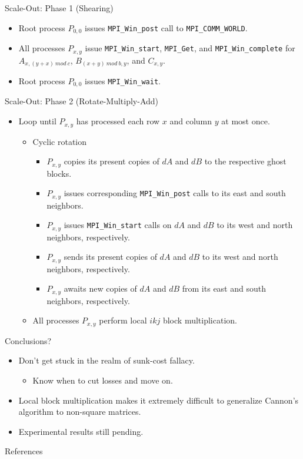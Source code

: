 \documentclass{beamer}
\begin{document}
\begin{frame}{Scale-Out: Phase 1 (Shearing)}
  \begin{itemize}
  \item{Root process $P_{0,0}$ issues \texttt{MPI\_Win\_post} call to \texttt{MPI\_COMM\_WORLD}.}
  \item{All processes $P_{x,y}$ issue \texttt{MPI\_Win\_start}, \texttt{MPI\_Get}, and \texttt{MPI\_Win\_complete} for $A_{x,(y+x)\ mod\ c}$, $B_{(x+y)\ mod\ b, y}$, and $C_{x,y}$.}
  \item{Root process $P_{0,0}$ issues \texttt{MPI\_Win\_wait}.}
  \end{itemize}
\end{frame}
\begin{frame}{Scale-Out: Phase 2 (Rotate-Multiply-Add)}
  \begin{itemize}
    \item{Loop until $P_{x,y}$ has processed each row $x$ and column $y$ at most once.}
      \begin{itemize}
      \item{Cyclic rotation}
        \begin{itemize}
        \item{$P_{x,y}$ copies its present copies of $dA$ and $dB$ to the respective ghost blocks.}
        \item{$P_{x,y}$ issues corresponding \texttt{MPI\_Win\_post} calls to its east and south neighbors.}
        \item{$P_{x,y}$ issues \texttt{MPI\_Win\_start} calls on $dA$ and $dB$ to its west and north neighbors, respectively.}
        \item{$P_{x,y}$ sends its present copies of $dA$ and $dB$ to its west and north neighbors, respectively.}
        \item{$P_{x,y}$ awaits new copies of $dA$ and $dB$ from its east and south neighbors, respectively.}
        \end{itemize}
      \item{All processes $P_{x,y}$ perform local $ikj$ block multiplication.}
      \end{itemize}
  \end{itemize}
\end{frame}
\begin{frame}{Conclusions?}
  \begin{itemize}
  \item{Don't get stuck in the realm of sunk-cost fallacy.}
    \begin{itemize}
      \item{Know when to cut losses and move on.}
    \end{itemize}
  \item{Local block multiplication makes it extremely difficult to generalize Cannon's algorithm to non-square matrices.}
  \item{Experimental results still pending.}
  \end{itemize}
\end{frame}
\begin{frame}[allowframebreaks]{References}
  \printbibliography
\end{frame}
\end{document}

